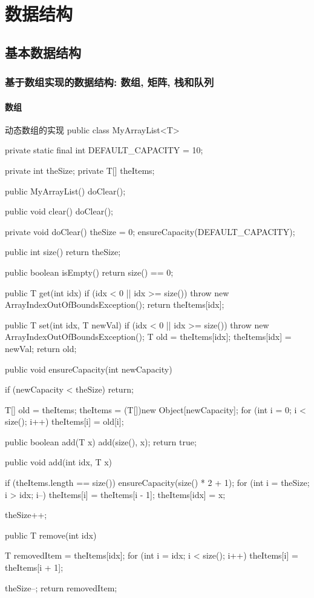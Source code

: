 \documentclass[oneside,10pt,fontset=none]{ctexbook}
\numberwithin{definition}{chapter}
\numberwithin{theorem}{chapter}
\numberwithin{lemma}{chapter}
\begin{document}
\part{数据结构}

\chapter{基本数据结构}

\section{基于数组实现的数据结构: 数组, 矩阵, 栈和队列}

\subsection{数组}

\begin{myjava}{}{动态数组的实现}{}
public class MyArrayList<T> {
    private static final int DEFAULT_CAPACITY = 10;

    private int theSize;
    private T[] theItems;

    public MyArrayList() {
        doClear();
    }

    public void clear() {
        doClear();
    }
    
    private void doClear() {
        theSize = 0;
        ensureCapacity(DEFAULT_CAPACITY);
    }

    public int size() {
        return theSize;
    }

    public boolean isEmpty() {
        return size() == 0;
    }

    public T get(int idx) {
        if (idx < 0 || idx >= size())
            throw new ArrayIndexOutOfBoundsException();
        return theItems[idx];
    }

    public T set(int idx, T newVal) {
        if (idx < 0 || idx >= size())
            throw new ArrayIndexOutOfBoundsException();
        T old = theItems[idx];
        theItems[idx] = newVal;
        return old;
    }

    public void ensureCapacity(int newCapacity) {
        if (newCapacity < theSize) return;

        T[] old = theItems;
        theItems = (T[])new Object[newCapacity];
        for (int i = 0; i < size(); i++)
            theItems[i] = old[i];
    }

    public boolean add(T x) {
        add(size(), x);
        return true;
    }

    public void add(int idx, T x) {
        if (theItems.length == size())
            ensureCapacity(size() * 2 + 1);
        for (int i = theSize; i > idx; i--)
            theItems[i] = theItems[i - 1];
        theItems[idx] = x;

        theSize++;
    }

    public T remove(int idx) {
        T removedItem = theItems[idx];
        for (int i = idx; i < size(); i++)
            theItems[i] = theItems[i + 1];
        
            theSize--;
            return removedItem;
    }
}
\end{myjava}
\end{document}
